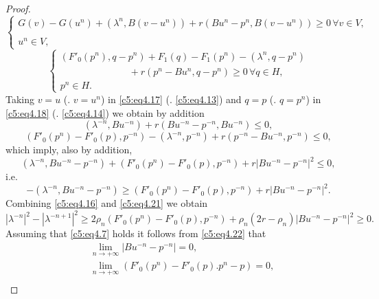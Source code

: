 \begin{proof}
\begin{equation}
\begin{cases}
G (v) - G (u^n) + (\lambda^n, B (v-u^n) ) + r (Bu^n - p^n, B(v-u^n)) \geq 0\, \forall v \in V,\\
& \\
u^n \in V, \tag{4.17}\label{c5:eq4.17}
\end{cases}
\end{equation}
\begin{equation}
\begin{cases}
(F'_0 (p^n), q-p^n) + F_1 (q) - F_1 (p^n) - (\lambda^n, q-p^n)\\ 
  \hspace{3cm}+ r (p^n - Bu^n, q-p^n) \geq 0\, \forall q \in H,\\
  p^n \in H.\tag{4.18}\label{c5:eq4.18}
\end{cases}
\end{equation}  
Taking $v = u$ (\resp. $v = u^n$) in \eqref{c5:eq4.17}
(\resp. \eqref{c5:eq4.13}) and $q = p$ (\resp. $q = p^n$) in
\eqref{c5:eq4.18} (\resp . \eqref{c5:eq4.14}) we obtain by addition 
\begin{equation}
(\lambda^{-n}, Bu^{-n}) + r (Bu^{-n} - p^{-n}, B u^{-n}) \leq 0,
  \tag{4.19}\label{c5:eq4.19} 
\end{equation}
\begin{equation}
(F'_0 (p^n) - F'_0 (p), p^{-n})- (\lambda^{-n}, p^{-n}) + r (p^{-n} -
  Bu^{-n}, p^{-n}) \leq 0, \tag{4.20}\label{c5:eq4.20} 
\end{equation}
which imply, also by addition,
$$
(\lambda^{-n}, Bu^{-n} -  p^{-n}) + (F'_0 (p^n) -  F'_0 (p), p^{-n}) +
r |Bu^{-n} - p^{-n}|^2 \leq 0,  
$$
i.e.
\begin{equation}
- (\lambda^{-n}, B u^{-n} - p^{-n}) \geq (F'_0 (p^n) - F'_0 (p), p^{-n}) + r |Bu^{-n} - p^{-n}|^2.\tag{4.21}\label{c5:eq4.21}
\end{equation}\pageoriginale  
Combining \eqref{c5:eq4.16} and \eqref{c5:eq4.21} we obtain 
\begin{equation}
|\lambda^{-n}|^2 - |\lambda^{-n+1}|^2 \geq 2 \rho_n (F'_0 (p^n) - F'_0
(p), p^{-n})+ \rho_n (2r - \rho_n) | B u^{-n} - p^{-n} | ^2 \geq
0. \tag{4.22}\label{c5:eq4.22} 
\end{equation} 
 Assuming that \eqref{c5:eq4.7} holds it follows from \eqref{c5:eq4.22} that 
 \begin{align}
&\lim_{n \to + \infty} |Bu^{-n} - p^{-n}| = 0,\tag{4.23}\label{c5:eq4.23}\\
&\lim_{n \to + \infty} (F'_0 (p^n) - F'_0 (p). p^n - p) = 0,\tag{4.24}\label{c5:eq4.24}\\

\end{align}
\end{proof}
